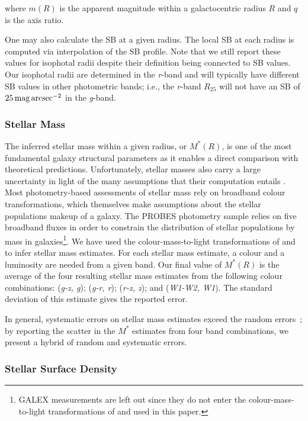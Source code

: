 \documentclass[twocolumn]{aastex631}
\newcommand{\wunits}[2]{\ensuremath{#1\,\text{#2}}}
\newcommand{\magss}{{mag{\,}arcsec\ensuremath{^{-2}}}\xspace}
\begin{document}
where $m(R)$ is the apparent magnitude within a galactocentric radius $R$ and $q$ is the axis ratio.

One may also calculate the SB at a given radius.
The local SB at each radius is computed via interpolation of the SB profile.
Note that we still report these values for isophotal radii despite their definition being connected to SB values.
Our isophotal radii are determined in the {\it r}-band and will typically have different SB values in other photometric bands; i.e., the {\it r}-band $R_{25}$ will not have an SB of \wunits{25}{\magss} in the {\it g}-band.

\subsubsection{Stellar Mass}\label{sec:evalstellarmass}

The inferred stellar mass within a given radius, or $M^*(R)$, is one of the most fundamental galaxy structural parameters as it enables a direct comparison with theoretical predictions. 
Unfortunately, stellar masses also carry a large uncertainty in light of the many assumptions that their computation entails \citep{Courteau2014}.
Most photometry-based assessments of stellar mass rely on broadband colour transformations, which themselves make assumptions about the stellar populations makeup of a galaxy. 
The PROBES photometry sample relies on five broadband fluxes in order to constrain the distribution of stellar populations by mass in galaxies\footnote{GALEX measurements are left out since they do not enter the colour-mass-to-light transformations of \citet{Cluver2014} and \citet{Roediger2015} used in this paper.}. 
We have used the colour-mass-to-light transformations of \citet{Cluver2014} and \citet{Roediger2015} to infer stellar mass estimates.
For each stellar mass estimate, a colour and a luminosity are needed from a given band.  
Our final value of $M^*(R)$ is the average of the four resulting stellar mass estimates from the following colour combinations: ({\it g-z, g}); ({\it g-r, r}); ({\it r-z, z}); and ({\it W1-W2, W1}).
The standard deviation of this estimate gives the reported error.

In general, systematic errors on stellar mass estimates exceed the random errors~\citep{Roediger2015}; by reporting the scatter in the $M^*$ estimates from four band combinations, we present a hybrid of random and systematic errors. 

\subsubsection{Stellar Surface Density}\label{sec:evalstellarsurfacedensity}
\end{document}
